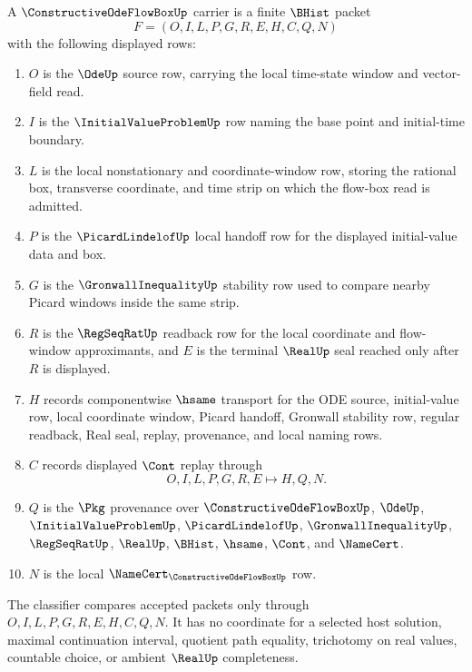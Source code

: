 \begin{definition}
\label{def:constructive-ode-flow-box-carrier}
A $\ConstructiveOdeFlowBoxUp$ carrier is a finite $\BHist$ packet
$$
F=(O,I,L,P,G,R,E,H,C,Q,N)
$$
with the following displayed rows:
\begin{enumerate}
\item $O$ is the $\OdeUp$ source row, carrying the local time-state window and vector-field read.
\item $I$ is the $\InitialValueProblemUp$ row naming the base point and initial-time boundary.
\item $L$ is the local nonstationary and coordinate-window row, storing the rational box, transverse coordinate, and time strip on which the flow-box read is admitted.
\item $P$ is the $\PicardLindelofUp$ local handoff row for the displayed initial-value data and box.
\item $G$ is the $\GronwallInequalityUp$ stability row used to compare nearby Picard windows inside the same strip.
\item $R$ is the $\RegSeqRatUp$ readback row for the local coordinate and flow-window approximants, and $E$ is the terminal $\RealUp$ seal reached only after $R$ is displayed.
\item $H$ records componentwise $\hsame$ transport for the ODE source, initial-value row, local coordinate window, Picard handoff, Gronwall stability row, regular readback, Real seal, replay, provenance, and local naming rows.
\item $C$ records displayed $\Cont$ replay through
$$
O,I,L,P,G,R,E \longmapsto H,Q,N .
$$
\item $Q$ is the $\Pkg$ provenance over $\ConstructiveOdeFlowBoxUp$, $\OdeUp$, $\InitialValueProblemUp$, $\PicardLindelofUp$, $\GronwallInequalityUp$, $\RegSeqRatUp$, $\RealUp$, $\BHist$, $\hsame$, $\Cont$, and $\NameCert$.
\item $N$ is the local $\NameCert_{\ConstructiveOdeFlowBoxUp}$ row.
\end{enumerate}
The classifier compares accepted packets only through $O,I,L,P,G,R,E,H,C,Q,N$. It has no coordinate for a selected host solution, maximal continuation interval, quotient path equality, trichotomy on real values, countable choice, or ambient $\RealUp$ completeness.
\end{definition}

